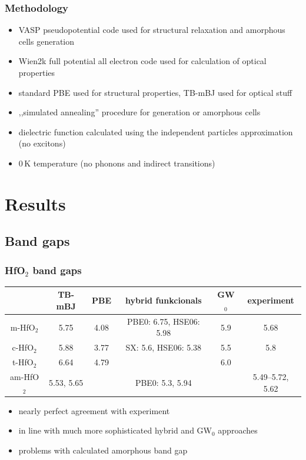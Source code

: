 \documentclass{beamer}
\begin{document}
\begin{frame}
   \frametitle{Methodology}
\begin{itemize}
   \item VASP pseudopotential code used for structural relaxation and amorphous cells generation
   \item Wien2k full potential all electron code used for calculation of optical properties
   \item standard PBE used for structural properties, TB-mBJ used for optical stuff
   \item ,,simulated annealing'' procedure for generation or amorphous cells
   \item dielectric function calculated using the independent particles approximation (no excitons)
   \item 0\,K temperature (no phonons and indirect transitions)
\end{itemize}

\end{frame}

\section{Results}

\subsection{Band gaps}
\begin{frame}
    \frametitle{HfO$_2$ band gaps}
   

   \begin{table}
   \begin{center}
   \scriptsize
   \begin{tabular}{c|ccccc}
			   & TB-mBJ & PBE & hybrid funkcionals & GW$_0$ & experiment \\
   \hline
   m-HfO$_2$ &	5.75 & 4.08 & PBE0: 6.75, HSE06: 5.98 & 5.9 & 5.68 \\
   c-HfO$_2$ &	5.88 & 3.77 & SX: 5.6, HSE06: 5.38 & 5.5 & 5.8\\
   t-HfO$_2$ &	6.64 & 4.79 &  & 6.0 & \\
   am-HfO$_2$ & \color{red}5.53, 5.65 & & \color{black} PBE0: 5.3, 5.94 &  & 5.49--5.72, 5.62\\

   \end{tabular}
   \end{center}
   \end{table}


\begin{itemize}
   \item nearly perfect agreement with experiment
   \item in line with much more sophisticated hybrid and GW$_0$ approaches
   \item problems with calculated amorphous band gap
\end{itemize}


\end{frame}
\end{document}
